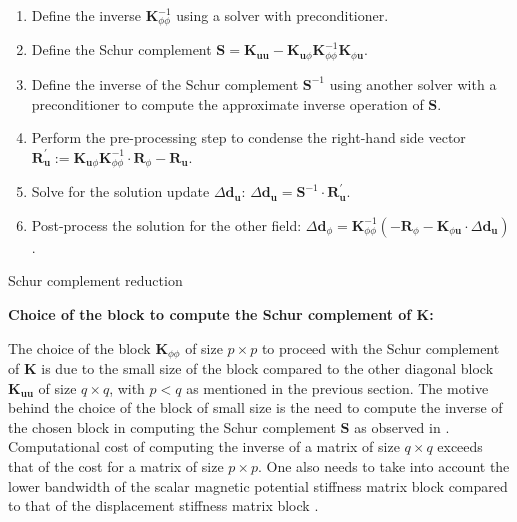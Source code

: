 \documentclass[11pt,a4paper,final]{article}
\begin{document}
\begin{algorithm}[h]
\begin{enumerate}
\item Define the inverse $\mathbf{K}_{\phi \phi}^{-1}$ using a solver with preconditioner.
\item Define the Schur complement $\mathbf{S} = \mathbf{K}_{\mathbf{u} \mathbf{u}} - \mathbf{K}_{\mathbf{u} \phi} \mathbf{K}_{\phi \phi}^{-1} \mathbf{K}_{\phi \mathbf{u}}$.
\item Define the inverse of the Schur complement $\mathbf{S}^{-1}$ using another solver with a preconditioner to compute the approximate inverse operation of $\mathbf{S}$. 
\item Perform the pre-processing step to condense the right-hand side vector $\mathbf{R}_{\mathbf{u}}^' := \mathbf{K}_{\mathbf{u} \phi} \mathbf{K}_{\phi \phi}^{-1} \cdot \mathbf{R}_{\phi} - \mathbf{R}_{\mathbf{u}}$.
\item Solve for the solution update $\Delta \mathbf{d}_{\mathbf{u}}$: $\Delta \mathbf{d}_{\mathbf{u}} = \mathbf{S}^{-1} \cdot \mathbf{R}_{\mathbf{u}}^'$.
\item Post-process the solution for the other field: $\Delta \mathbf{d}_{\phi} = \mathbf{K}_{\phi \phi}^{-1} \left( -\mathbf{R}_{\phi} - \mathbf{K}_{\phi \mathbf{u}} \cdot \Delta \mathbf{d}_{\mathbf{u}} \right)$. 
\end{enumerate}
\caption{Schur complement reduction}
\label{alg:3.1}
\end{algorithm} 

\begin{large}
\noindent \textbf{Choice of the block to compute the Schur complement of $\mathbf{K}$:}\\
\end{large}
\indent The choice of the block $\mathbf{K}_{\phi \phi}$  of size $p \times p$ to proceed with the Schur complement of $\mathbf{K}$ is due to the small size of the block compared to the other diagonal block $\mathbf{K}_{\mathbf{u} \mathbf{u}}$ of size $q \times q$, with $p < q$ as mentioned in the previous section. The motive behind the choice of the block of small size is the need to compute the inverse of the chosen block in computing the Schur complement $\mathbf{S}$ as observed in . Computational cost of computing the inverse of a matrix of size $q \times q$ exceeds that of the cost for a matrix of size $p \times p$. One also needs to take into account the lower bandwidth of the scalar magnetic potential stiffness matrix block compared to that of the displacement stiffness matrix block \cite{Pelteret2016}. \newline \par 
\end{document}
